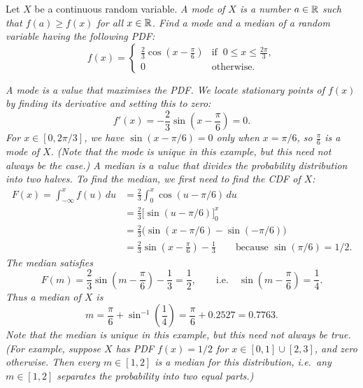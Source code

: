 \begin{exercise}
\begin{questions}
\question
Let $X$ be a continuous random variable. 
\bit
\it A \emph{mode} of $X$ is a number $a\in\mathbb{R}$ such that $f(a)\geq f(x)$ for all $x\in\mathbb{R}$. %
\eit
Find a mode and a median of a random variable having the following PDF:
\[
f(x) = \begin{cases}
\displaystyle\frac{2}{3}\cos\left(x-\frac{\pi}{6}\right)	& \text{if }\ 0\leq x \leq \displaystyle\frac{2\pi}{3}, \\[2ex]
0											& \text{otherwise.}
\end{cases}
\]
\begin{answer}
\ben
\it %
A mode is a value that maximises the PDF. We locate stationary points of $f(x)$ by finding its derivative and setting this to zero:
\[
f'(x) = -\frac{2}{3}\sin\left(x-\frac{\pi}{6}\right) = 0.
\]
For $x\in [0,2\pi/3]$, we have $\sin(x-\pi/6) = 0$ only when $x=\pi/6$, so $\frac{\pi}{6}$ is a mode of $X$. (Note that the mode is unique in this example, but this need not always be the case.)
\it %
A median is a value that divides the probability distribution into two halves. To find the median, we first need to find the CDF of $X$:
\begin{align*}
F(x) = \int_{-\infty}^x f(u)\,du
	& = \frac{2}{3}\int_0^x \cos(u-\pi/6)\,du \\
	& = \frac{2}{3}\Big[\sin(u-\pi/6)\Big]_0^x \\
	& = \frac{2}{3}\Big(\sin(x-\pi/6) - \sin(-\pi/6)\Big) \\
	& = \frac{2}{3}\sin\left(x-\frac{\pi}{6}\right) - \frac{1}{3} \qquad\text{because $\sin(\pi/6)=1/2$.}
\end{align*}
The median satisfies 
\[
F(m) = \frac{2}{3}\sin\left(m-\frac{\pi}{6}\right) - \frac{1}{3} = \frac{1}{2}, 
\qquad\text{i.e.}\quad 
\sin\left(m-\frac{\pi}{6}\right) = \frac{1}{4}.
\]
Thus a median of $X$ is 
\[
m = \frac{\pi}{6} + \sin^{-1}\left(\frac{1}{4}\right) = \frac{\pi}{6} + 0.2527 = 0.7763.
\]
Note that the median is unique in this example, but this need not always be true. (For example, suppose $X$ has PDF $f(x)=1/2$ for $x\in[0,1]\cup[2,3]$, and zero otherwise. Then every $m\in[1,2]$ is a median for this distribution, i.e.\ any $m\in[1,2]$ separates the probability into two equal parts.)
\een
\end{answer}


\end{questions}
\end{exercise}
